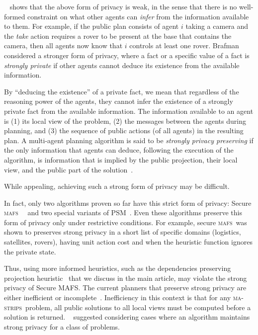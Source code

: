 \documentclass{article}
\newcommand{\mafs}{\textsc {mafs}\xspace}
\newcommand{\mastrips}{\textsc {ma-strips}\xspace}
\newcommand{\commentout}[1]{}
\newcommand{\rotem}[1]{\textbf{\color{red}[ROTEM:#1]}}
\theoremstyle{remark}
\newcommand{\citet}[1]{\citeauthor{#1}~\shortcite{#1}}
\newcommand{\citep}[1]{\cite{#1}}
\begin{document}
	\citet{Brafman15} shows that the above form of privacy is weak, in the sense that there is no well-formed constraint on what other agents can {\em infer} from the information available to them. For example, if the public plan consists of agent $i$ taking a camera and the {\em take} action requires a rover to be present at the base that contains the camera, then all agents now know that $i$ controls at least one rover.\commentout{\rotem{taking a camera and the {\em take} action requires a rover to be present at the base that contains the camera, then all agents now know that $i$ controls at least one rover.}}\commentout{picking up a package and the pickup action requires a truck to be present at the location of the package, then all agents now know that $i$ controls at least one truck.} Brafman considered a stronger form of privacy, where a fact or a specific value of a fact is {\em strongly private} if other agents cannot deduce its existence from the available information.
		
	By ``deducing the existence'' of a private fact, we mean that regardless of the reasoning power of the agents, they cannot infer the existence of a strongly private fact from the available information. The information available to an agent is (1) its local view of the problem, (2) the messages between the agents during planning, and (3) the sequence of public actions (of all agents) in the resulting plan. 
     A multi-agent planning algorithm is said to be {\em strongly privacy preserving} if the only information that agents can deduce, following the execution of the algorithm, is information that is implied by the public projection, their local view, and the public part of the solution~\citep{Brafman15}. 
	
	While appealing, achieving such a strong form of privacy may be difficult. 
	\commentout{\rotem{Guy, is it still only two algorithms or since the previous paper some more algorithms with this property have arrived?}}
    In fact, only two algorithms proven so far have this strict form of privacy: Secure \mafs\ ~\citep{Brafman15} and 
    two special variants of PSM~\citep{tozicka2017theLimits}. Even these algorithms preserve this form of privacy only under restrictive conditions. 
    For example, secure \mafs\ was shown to preserves strong privacy in a short list of specific domains (logistics, satellites, rovers), having unit action cost and when the heuristic function ignores the private state. 
    
    Thus, using more informed heuristics, such as the dependencies preserving projection heuristic~\citep{DPP}\commentout{\rotem{, such as the dependencies preserving heuristic}} that we discuss in the main article, may violate the strong privacy of Secure MAFS. The current planners that preserve strong privacy are either inefficient or incomplete~\citep{tozicka2017theLimits,Leakage}. 
    Inefficiency in this context is that for any \mastrips\ problem, all public solutions to all local views must be computed before a solution is returned. \citet{tozicka2017theLimits} suggested considering cases where an algorithm maintains strong privacy for a class of problems.
  
\end{document}
